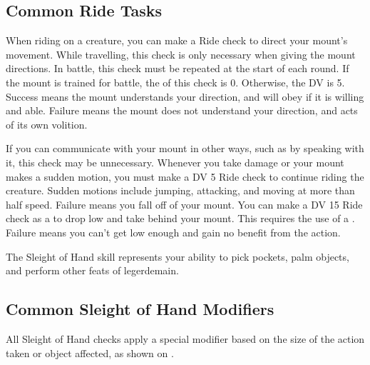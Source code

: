     \subsection{Common Ride Tasks}
         When riding on a creature, you can make a Ride check to direct your mount's movement.
        While travelling, this check is only necessary when giving the mount directions.
        In battle, this check must be repeated at the start of each round.
        If the mount is trained for battle, the  of this check is 0.
        Otherwise, the DV is 5.
        Success means the mount understands your direction, and will obey if it is willing and able.
        Failure means the mount does not understand your direction, and acts of its own volition.
        
        If you can communicate with your mount in other ways, such as by speaking with it, this check may be unnecessary.
         Whenever you take damage or your mount makes a sudden motion, you must make a DV 5 Ride check to continue riding the creature.
        Sudden motions include jumping, attacking, and moving at more than half speed.
        Failure means you fall off of your mount.
         You can make a DV 15 Ride check as a  to drop low and take  behind your mount.
        This requires the use of a .
        Failure means you can't get low enough and gain no benefit from the action.

\newpage
{}
        The Sleight of Hand skill represents your ability to pick pockets, palm objects, and perform other feats of legerdemain.

        \subsection{Common Sleight of Hand Modifiers}
            All Sleight of Hand checks apply a special modifier based on the size of the action taken or object affected, as shown on .

